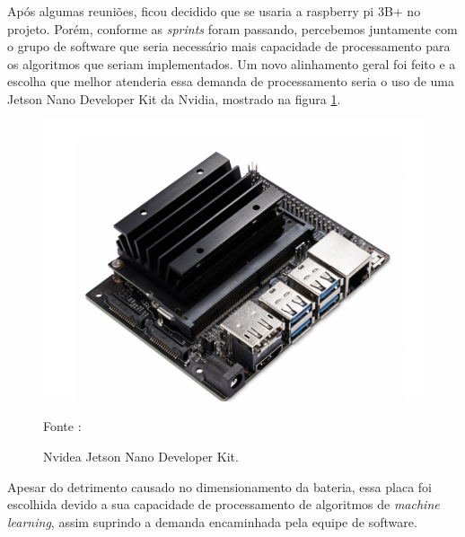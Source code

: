 Após algumas reuniões, ficou decidido que se usaria a raspberry pi 3B+ no projeto. Porém, conforme as  \textit{sprints} foram passando, percebemos juntamente com o grupo de software que seria necessário mais capacidade de processamento para os algoritmos que seriam implementados. Um novo alinhamento geral foi feito e a escolha que melhor atenderia essa demanda de processamento seria o uso de uma Jetson Nano Developer Kit da Nvidia, mostrado na figura \ref{fig:Nvidea}. 

\begin{figure}[H]
  \centering
  \includegraphics[scale=0.8]{figuras/NvideaPI2.png}
  \caption{Nvidea Jetson Nano Developer Kit. } 
  {\footnotesize Fonte : \cite{Nvidia_Nano} } 
  \label{fig:Nvidea}
\end{figure}

Apesar do detrimento causado no dimensionamento da bateria, essa placa foi escolhida devido a sua capacidade de processamento de algoritmos de  \textit{machine learning}, assim suprindo a demanda encaminhada pela equipe de software.
